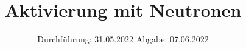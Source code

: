 

\subject{V702}
\title{Aktivierung mit Neutronen}
\date{%
  Durchführung: 31.05.2022
  \hspace{3em}
  Abgabe: 07.06.2022
}



\maketitle
\thispagestyle{empty}
\tableofcontents
\newpage






\printbibliography{}

\appendix
\newpage



